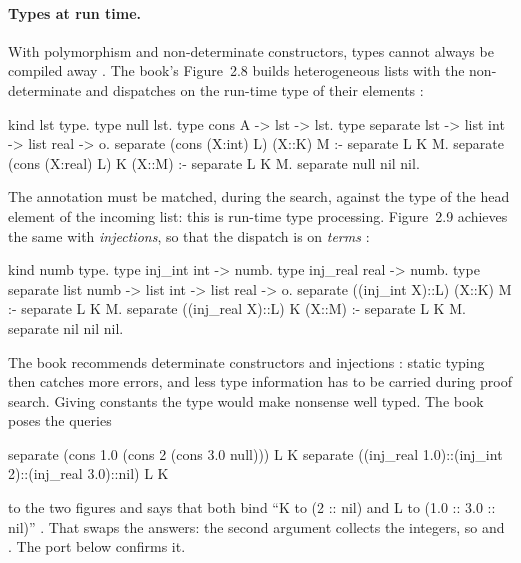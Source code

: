 \paragraph{Types at run time.} With polymorphism and non-determinate constructors, types cannot always be
compiled away . The book's Figure~2.8 builds heterogeneous lists with the non-determinate
 and dispatches on the run-time type of their elements :
\begin{lprolog}
kind lst       type.
type null      lst.
type cons      A -> lst -> lst.
type separate  lst -> list int -> list real -> o.
separate (cons (X:int)  L) (X::K) M :- separate L K M.
separate (cons (X:real) L) K (X::M) :- separate L K M.
separate null nil nil.
\end{lprolog}
The annotation  must be matched, during the search, against the type of the head element of
the incoming list: this is run-time type processing. Figure~2.9 achieves the same with
\emph{injections}, so that the dispatch is on \emph{terms} :
\begin{lprolog}
kind numb      type.
type inj_int   int  -> numb.
type inj_real  real -> numb.
type separate  list numb -> list int -> list real -> o.
separate ((inj_int  X)::L) (X::K) M :- separate L K M.
separate ((inj_real X)::L) K (X::M) :- separate L K M.
separate nil nil nil.
\end{lprolog}
The book recommends determinate constructors and injections : static typing then catches more
errors, and less type information has to be carried during proof search. Giving constants the type 
would make nonsense well typed. The book poses the queries
\begin{lprolog}
separate (cons 1.0 (cons 2 (cons 3.0 null))) L K
separate ((inj_real 1.0)::(inj_int 2)::(inj_real 3.0)::nil) L K
\end{lprolog}
to the two figures and says that both bind ``K to (2 :: nil) and L to (1.0 :: 3.0 :: nil)'' .
That swaps the answers: the second argument collects the integers, so  and
. The \micro{} port below confirms it.

